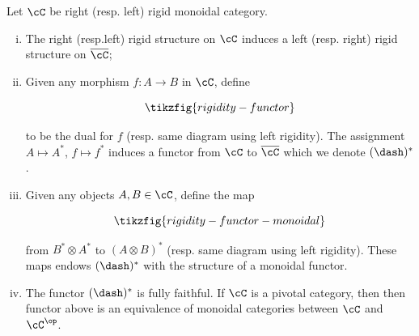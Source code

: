 \begin{prop}\label{rigidity-functorial} Let $\cC$ be right (resp. left) rigid monoidal category. 

\begin{enumerate}[(i)]
\item The right (resp.left) rigid structure on $\cC$ induces a left (resp. right) rigid structure on $\overline{\cC}$;

\item Given any morphism $f: A\to B$ in $\cC$, define

\begin{equation*}
\tikzfig{rigidity-functor}
\end{equation*}

to be the dual for $f$ (resp. same diagram using left rigidity). The assignment $A\mapsto A^*$, $f\mapsto f^*$ induces a functor from $\cC$ to $\overline{\cC}$ which we denote $(\dash)^{*}$.

\item Given any objects $A,B\in \cC$, define the map

\begin{equation*}
\tikzfig{rigidity-functor-monoidal}
\end{equation*}

from $B^*\otimes A^*$ to $(A\otimes B)^*$ (resp. same diagram using left rigidity). These maps endows $(\dash)^{*}$ with the structure of a monoidal functor.

\item The functor $(\dash)^*$ is fully faithful. If $\cC$ is a pivotal category, then then functor above is an equivalence of monoidal categories between $\cC$ and $\cC^{\op}$.

\end{enumerate}
\end{prop}
